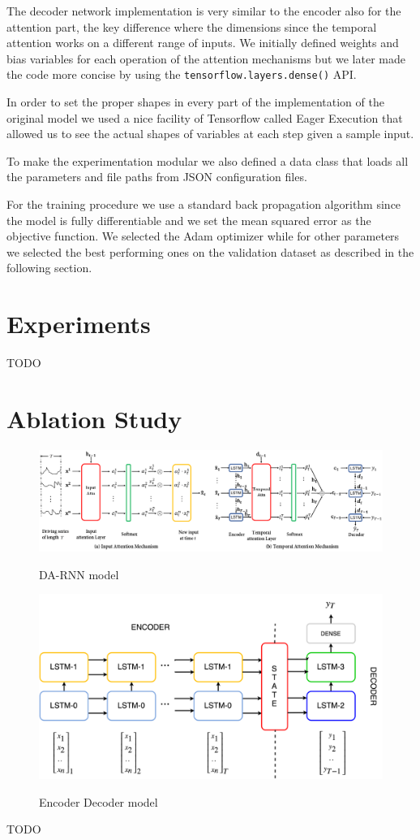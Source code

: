 \documentclass{article}
\begin{document}
The decoder network implementation is very similar to the encoder also for the 
attention part, the key difference where 
the dimensions since the temporal attention works on a different range of 
inputs. We initially defined weights and bias 
variables for each operation of the attention mechanisms but we later made the 
code more concise by using the 
\texttt{tensorflow.layers.dense()} API.

In order to set the proper shapes in every part of the implementation of the 
original model we used a nice facility of 
Tensorflow called Eager Execution that allowed us to see the actual shapes of 
variables at each step given a sample 
input.

To make the experimentation modular we also defined a data class that loads all 
the parameters and file paths from 
JSON configuration files.

For the training procedure we use a standard back propagation algorithm since 
the model is fully differentiable and we 
set the mean squared error as the objective function. We selected the Adam 
optimizer while for other parameters we 
selected the best performing ones on the validation dataset as described in the 
following section.

\section{Experiments}

TODO

\section{Ablation Study}

\begin{figure}[h]
\centering
\includegraphics[width=\linewidth]{img/da-rnn.png} \\
\caption{DA-RNN model}
\label{fig:da-rnn}
\end{figure}


\begin{figure}[h]
\centering
\includegraphics[width=0.7\linewidth]{img/ende-rnn.png} \\
\caption{Encoder Decoder model}
\label{fig:ende-rnn}
\end{figure}
TODO
\end{document}
